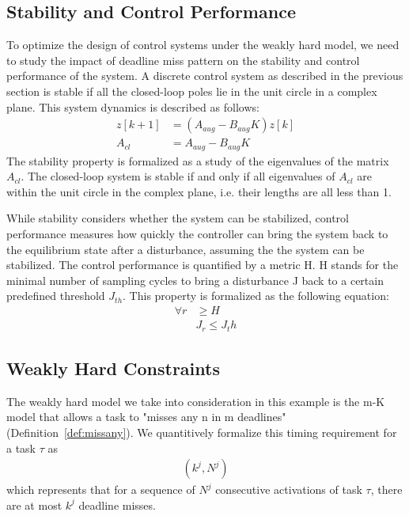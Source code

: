 \subsection{Stability and Control Performance} \label{stability and control performance}
To optimize the design of control systems under the weakly hard model, we need to study the impact of deadline miss pattern on the stability and control performance of the system. A discrete control system as described in the previous section is stable if all the closed-loop poles lie in the unit circle in a complex plane. This system dynamics is described as follows:
\begin{align*}
z[k + 1] &= (A_{aug} - B_{aug}K)z[k] \\
A_{cl} &= A_{aug} - B_{aug}K
\end{align*}
The stability property is formalized as a study of the eigenvalues of the matrix $A_{cl}$. The closed-loop system is stable if and only if all eigenvalues of $A_{cl}$ are within the unit circle in the complex plane, i.e. their lengths are all less than 1.

While stability considers whether the system can be stabilized, control performance measures how quickly the controller can bring the system back to the equilibrium state after a disturbance, assuming the the system can be stabilized. The control performance is quantified by a metric H. H stands for the minimal number of sampling cycles to bring a disturbance J back to a certain predefined threshold $J_{th}$. This property is formalized as the following equation:
\begin{align*}
 \forall r &\ge H \\
 &J_r \le J_th 
\end{align*}

\subsection{Weakly Hard Constraints} \label{weakly hard constraints formulation}
The weakly hard model we take into consideration in this example is the m-K model that allows a task to "misses any n in m deadlines" (Definition~\ref{def:missany}). We quantitively formalize this timing requirement for a task $\tau$ as
\begin{align*}
(k^{j}, N^{j})
\end{align*}
which represents that for a sequence of $N^{j}$ consecutive activations of task $\tau$, there are at most $k^{j}$ deadline misses. 

